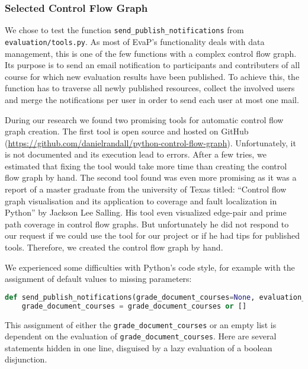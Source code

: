 \usetikzlibrary{arrows,automata}

\subsubsection{Selected Control Flow Graph}
We chose to test the function \texttt{send\_publish\_notifications} from \texttt{evaluation/tools.py}.
As most of EvaP's functionality deals with data management, this is one of the few functions with a complex control flow graph.
Its purpose is to send an email notification to participants and contributers of all course for which new evaluation results have been published.
To achieve this, the function has to traverse all newly published resources, collect the involved users and merge the notifications per user in order to send each user at most one mail.

During our research we found two promising tools for automatic control flow graph creation. 
The first tool is open source and hosted on GitHub (\url{https://github.com/danielrandall/python-control-flow-graph}). 
Unfortunately, it is not documented and its execution lead to errors. 
After a few tries, we estimated that fixing the tool would take more time than creating the control flow graph by hand.
The second tool found was even more promising as it was a report of a master graduate from the university of Texas titled: 
``Control flow graph visualisation and its application to coverage and fault localization in Python''
by Jackson Lee Salling.
His tool even visualized edge-pair and prime path coverage in control flow graphs.
But unfortunately he did not respond to our request if we could use the tool for our project or if he had tips for published tools.
Therefore, we created the control flow graph by hand.

We experienced some difficulties with Python's code style, for example with the assignment of default values to missing parameters:
\begin{lstlisting}[language=Python, breaklines]
def send_publish_notifications(grade_document_courses=None, evaluation_results_courses=None):
    grade_document_courses = grade_document_courses or []
\end{lstlisting}
This assignment of either the \texttt{grade\_document\_courses} or an empty list is dependent on the evaluation of \texttt{grade\_document\_courses}.
Here are several statements hidden in one line, disguised by a lazy evaluation of a boolean disjunction.



